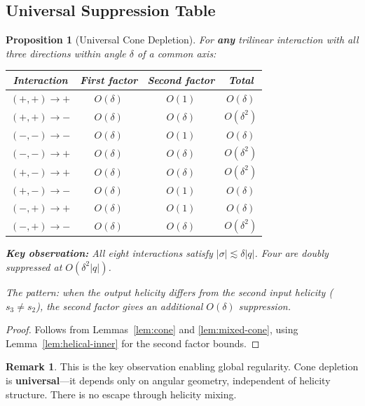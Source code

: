 \documentclass[11pt]{article}
\newtheorem{proposition}[theorem]{Proposition}
\theoremstyle{definition}
\newtheorem{remark}[theorem]{Remark}
\begin{document}
\subsection{Universal Suppression Table}

\begin{proposition}[Universal Cone Depletion]\label{prop:universal}
For \textbf{any} trilinear interaction with all three directions within angle $\delta$ of a common axis:

\begin{center}
\begin{tabular}{|c|c|c|c|}
\hline
\textbf{Interaction} & \textbf{First factor} & \textbf{Second factor} & \textbf{Total} \\
\hline
$(+,+) \to +$ & $O(\delta)$ & $O(1)$ & $O(\delta)$ \\
$(+,+) \to -$ & $O(\delta)$ & $O(\delta)$ & $O(\delta^2)$ \\
$(-,-) \to -$ & $O(\delta)$ & $O(1)$ & $O(\delta)$ \\
$(-,-) \to +$ & $O(\delta)$ & $O(\delta)$ & $O(\delta^2)$ \\
$(+,-) \to +$ & $O(\delta)$ & $O(\delta)$ & $O(\delta^2)$ \\
$(+,-) \to -$ & $O(\delta)$ & $O(1)$ & $O(\delta)$ \\
$(-,+) \to +$ & $O(\delta)$ & $O(1)$ & $O(\delta)$ \\
$(-,+) \to -$ & $O(\delta)$ & $O(\delta)$ & $O(\delta^2)$ \\
\hline
\end{tabular}
\end{center}

\textbf{Key observation:} All eight interactions satisfy $|\sigma| \lesssim \delta |q|$. Four are doubly suppressed at $O(\delta^2 |q|)$.

The pattern: when the output helicity \emph{differs} from the second input helicity ($s_3 \neq s_2$), the second factor gives an additional $O(\delta)$ suppression.
\end{proposition}

\begin{proof}
Follows from Lemmas~\ref{lem:cone} and \ref{lem:mixed-cone}, using Lemma~\ref{lem:helical-inner} for the second factor bounds.
\end{proof}

\begin{remark}
This is the key observation enabling global regularity. Cone depletion is \textbf{universal}---it depends only on angular geometry, independent of helicity structure. There is no escape through helicity mixing.
\end{remark}
\end{document}
